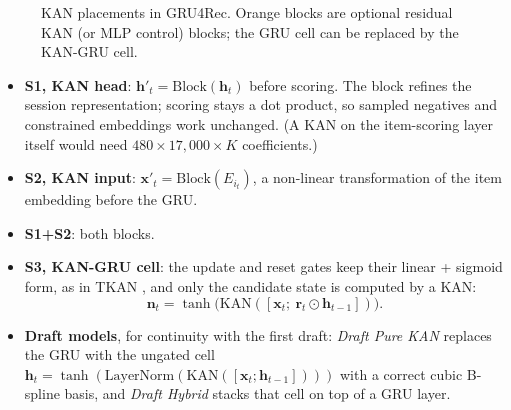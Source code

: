 \documentclass[12pt,a4paper]{report}
\begin{document}
\begin{figure}[H]
\centering
{}
\caption{KAN placements in GRU4Rec. Orange blocks are optional residual KAN (or
MLP control) blocks; the GRU cell can be replaced by the KAN-GRU cell.}
\label{fig:placements}
\end{figure}

\begin{itemize}
    \item \textbf{S1, KAN head}: $\mathbf{h}'_t = \mathrm{Block}(\mathbf{h}_t)$
          before scoring. The block refines the session representation; scoring
          stays a dot product, so sampled negatives and constrained embeddings
          work unchanged. (A KAN on the item-scoring layer itself would need
          $480 \times 17{,}000 \times K$ coefficients.)
    \item \textbf{S2, KAN input}: $\mathbf{x}'_t = \mathrm{Block}(E_{i_t})$, a
          non-linear transformation of the item embedding before the GRU.
    \item \textbf{S1+S2}: both blocks.
    \item \textbf{S3, KAN-GRU cell}: the update and reset gates keep their linear
          + sigmoid form, as in TKAN \cite{genet2024}, and only the candidate
          state is computed by a KAN:
          \begin{equation}
          \mathbf{n}_t = \tanh\big(\mathrm{KAN}([\mathbf{x}_t;\ \mathbf{r}_t \odot \mathbf{h}_{t-1}])\big).
          \end{equation}
    \item \textbf{Draft models}, for continuity with the first draft:
          \emph{Draft Pure KAN} replaces the GRU with the ungated cell
          $\mathbf{h}_t = \tanh(\mathrm{LayerNorm}(\mathrm{KAN}([\mathbf{x}_t;\mathbf{h}_{t-1}])))$
          with a correct cubic B-spline basis, and \emph{Draft Hybrid} stacks that
          cell on top of a GRU layer.
\end{itemize}
\end{document}

